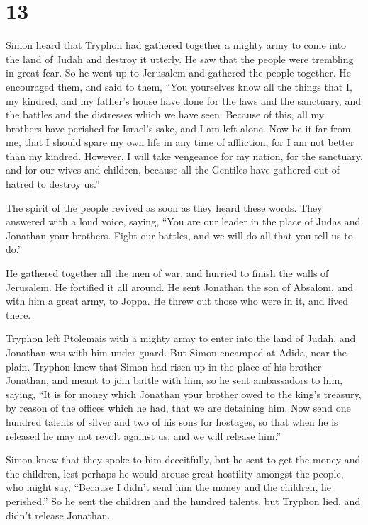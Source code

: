 \hypertarget{section-12}{%
\section{13}\label{section-12}}

 Simon heard that Tryphon had gathered together a mighty
army to come into the land of Judah and destroy it utterly. 
He saw that the people were trembling in great fear. So he went up to
Jerusalem and gathered the people together.  He encouraged
them, and said to them, ``You yourselves know all the things that I, my
kindred, and my father's house have done for the laws and the sanctuary,
and the battles and the distresses which we have seen. 
Because of this, all my brothers have perished for Israel's sake, and I
am left alone.  Now be it far from me, that I should spare
my own life in any time of affliction, for I am not better than my
kindred.  However, I will take vengeance for my nation, for
the sanctuary, and for our wives and children, because all the Gentiles
have gathered out of hatred to destroy us.''

 The spirit of the people revived as soon as they heard
these words.  They answered with a loud voice, saying, ``You
are our leader in the place of Judas and Jonathan your brothers.
 Fight our battles, and we will do all that you tell us to
do.''

 He gathered together all the men of war, and hurried to
finish the walls of Jerusalem. He fortified it all around. 
He sent Jonathan the son of Absalom, and with him a great army, to
Joppa. He threw out those who were in it, and lived there.

 Tryphon left Ptolemais with a mighty army to enter into
the land of Judah, and Jonathan was with him under guard. 
But Simon encamped at Adida, near the plain.  Tryphon knew
that Simon had risen up in the place of his brother Jonathan, and meant
to join battle with him, so he sent ambassadors to him, saying,
 ``It is for money which Jonathan your brother owed to the
king's treasury, by reason of the offices which he had, that we are
detaining him.  Now send one hundred talents of silver and
two of his sons for hostages, so that when he is released he may not
revolt against us, and we will release him.''

 Simon knew that they spoke to him deceitfully, but he sent
to get the money and the children, lest perhaps he would arouse great
hostility amongst the people,  who might say, ``Because I
didn't send him the money and the children, he perished.'' 
So he sent the children and the hundred talents, but Tryphon lied, and
didn't release Jonathan.

